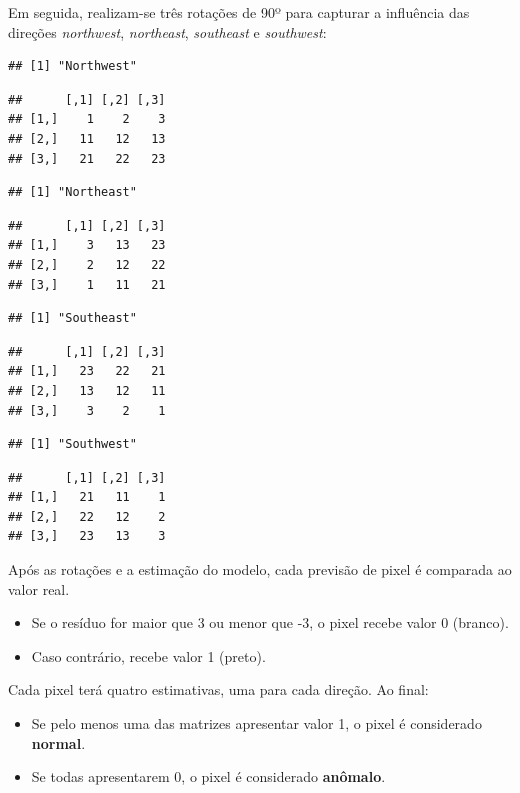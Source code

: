 \documentclass[
]{article}
\begin{document}
Em seguida, realizam-se três rotações de 90º para capturar a influência das direções \emph{northwest}, \emph{northeast}, \emph{southeast} e \emph{southwest}:

\begin{verbatim}
## [1] "Northwest"
\end{verbatim}

\begin{verbatim}
##      [,1] [,2] [,3]
## [1,]    1    2    3
## [2,]   11   12   13
## [3,]   21   22   23
\end{verbatim}

\begin{verbatim}
## [1] "Northeast"
\end{verbatim}

\begin{verbatim}
##      [,1] [,2] [,3]
## [1,]    3   13   23
## [2,]    2   12   22
## [3,]    1   11   21
\end{verbatim}

\begin{verbatim}
## [1] "Southeast"
\end{verbatim}

\begin{verbatim}
##      [,1] [,2] [,3]
## [1,]   23   22   21
## [2,]   13   12   11
## [3,]    3    2    1
\end{verbatim}

\begin{verbatim}
## [1] "Southwest"
\end{verbatim}

\begin{verbatim}
##      [,1] [,2] [,3]
## [1,]   21   11    1
## [2,]   22   12    2
## [3,]   23   13    3
\end{verbatim}

Após as rotações e a estimação do modelo, cada previsão de pixel é comparada ao valor real.

\begin{itemize}
  \item Se o resíduo for maior que 3 ou menor que -3, o pixel recebe valor 0 (branco).
  \item Caso contrário, recebe valor 1 (preto).
\end{itemize}

Cada pixel terá quatro estimativas, uma para cada direção. Ao final:

\begin{itemize}
  \item Se pelo menos uma das matrizes apresentar valor 1, o pixel é considerado \textbf{normal}.
  \item Se todas apresentarem 0, o pixel é considerado \textbf{anômalo}.
\end{itemize}
\end{document}
